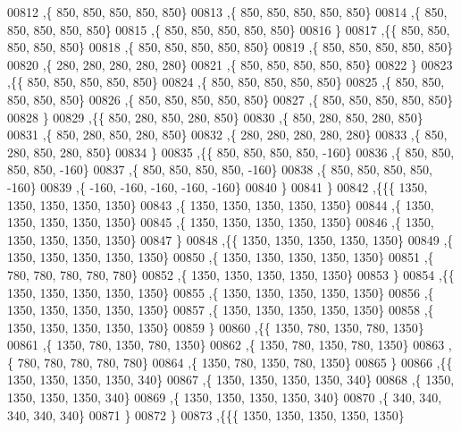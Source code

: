 \begin{DoxyCode}
00812    ,\{   850,   850,   850,   850,   850\}
00813    ,\{   850,   850,   850,   850,   850\}
00814    ,\{   850,   850,   850,   850,   850\}
00815    ,\{   850,   850,   850,   850,   850\}
00816    \}
00817   ,\{\{   850,   850,   850,   850,   850\}
00818    ,\{   850,   850,   850,   850,   850\}
00819    ,\{   850,   850,   850,   850,   850\}
00820    ,\{   280,   280,   280,   280,   280\}
00821    ,\{   850,   850,   850,   850,   850\}
00822    \}
00823   ,\{\{   850,   850,   850,   850,   850\}
00824    ,\{   850,   850,   850,   850,   850\}
00825    ,\{   850,   850,   850,   850,   850\}
00826    ,\{   850,   850,   850,   850,   850\}
00827    ,\{   850,   850,   850,   850,   850\}
00828    \}
00829   ,\{\{   850,   280,   850,   280,   850\}
00830    ,\{   850,   280,   850,   280,   850\}
00831    ,\{   850,   280,   850,   280,   850\}
00832    ,\{   280,   280,   280,   280,   280\}
00833    ,\{   850,   280,   850,   280,   850\}
00834    \}
00835   ,\{\{   850,   850,   850,   850,  -160\}
00836    ,\{   850,   850,   850,   850,  -160\}
00837    ,\{   850,   850,   850,   850,  -160\}
00838    ,\{   850,   850,   850,   850,  -160\}
00839    ,\{  -160,  -160,  -160,  -160,  -160\}
00840    \}
00841   \}
00842  ,\{\{\{  1350,  1350,  1350,  1350,  1350\}
00843    ,\{  1350,  1350,  1350,  1350,  1350\}
00844    ,\{  1350,  1350,  1350,  1350,  1350\}
00845    ,\{  1350,  1350,  1350,  1350,  1350\}
00846    ,\{  1350,  1350,  1350,  1350,  1350\}
00847    \}
00848   ,\{\{  1350,  1350,  1350,  1350,  1350\}
00849    ,\{  1350,  1350,  1350,  1350,  1350\}
00850    ,\{  1350,  1350,  1350,  1350,  1350\}
00851    ,\{   780,   780,   780,   780,   780\}
00852    ,\{  1350,  1350,  1350,  1350,  1350\}
00853    \}
00854   ,\{\{  1350,  1350,  1350,  1350,  1350\}
00855    ,\{  1350,  1350,  1350,  1350,  1350\}
00856    ,\{  1350,  1350,  1350,  1350,  1350\}
00857    ,\{  1350,  1350,  1350,  1350,  1350\}
00858    ,\{  1350,  1350,  1350,  1350,  1350\}
00859    \}
00860   ,\{\{  1350,   780,  1350,   780,  1350\}
00861    ,\{  1350,   780,  1350,   780,  1350\}
00862    ,\{  1350,   780,  1350,   780,  1350\}
00863    ,\{   780,   780,   780,   780,   780\}
00864    ,\{  1350,   780,  1350,   780,  1350\}
00865    \}
00866   ,\{\{  1350,  1350,  1350,  1350,   340\}
00867    ,\{  1350,  1350,  1350,  1350,   340\}
00868    ,\{  1350,  1350,  1350,  1350,   340\}
00869    ,\{  1350,  1350,  1350,  1350,   340\}
00870    ,\{   340,   340,   340,   340,   340\}
00871    \}
00872   \}
00873  ,\{\{\{  1350,  1350,  1350,  1350,  1350\}

\end{DoxyCode}
